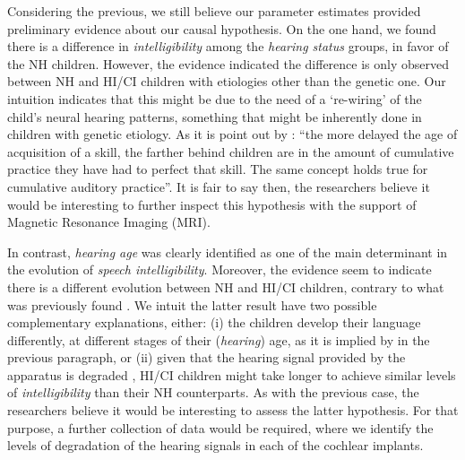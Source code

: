 \begin{comment}
These claims are easier to understand using a though experiment within our research. Consider we have two children with the same mean entropy, but the second child shows more variability across the $10$ utterances than the first. It is clear that the average entropy measure informs about the child's average SI, indicating that both children have similar level. However, the entropy's heterogeneity across the $10$ utterances also informs about the child's SI, as a higher variability imply transcribers agreed less about the second child's intelligibility.
\end{comment}

Considering the previous, we still believe our parameter estimates provided preliminary evidence about our causal hypothesis. On the one hand, we found there is a difference in \textit{intelligibility} among the \textit{hearing status} groups, in favor of the NH children. However, the evidence indicated the difference is only observed between NH and HI/CI children with etiologies other than the genetic one. Our intuition indicates that this might be due to the need of a `re-wiring' of the child's neural hearing patterns, something that might be inherently done in children with genetic etiology. As it is point out by \citet{Flexer_2011}: ``the more delayed the age of acquisition of a skill, the farther behind children are in the amount of cumulative practice they have had to perfect that skill. The same concept holds true for cumulative auditory practice''. It is fair to say then, the researchers believe it would be interesting to further inspect this hypothesis with the support of Magnetic Resonance Imaging (MRI).

In contrast, \textit{hearing age} was clearly identified as one of the main determinant in the evolution of \textit{speech intelligibility}. Moreover, the evidence seem to indicate there is a different evolution between NH and HI/CI children, contrary to what was previously found \cite{Boonen_et_al_2021}. We intuit the latter result have two possible complementary explanations, either: (i) the children develop their language differently, at different stages of their (\textit{hearing}) age, as it is implied by \citet{Flexer_2011} in the previous paragraph, or (ii) given that the hearing signal provided by the apparatus is degraded \cite{Drennan_et_al_2008}, HI/CI children might take longer to achieve similar levels of \textit{intelligibility} than their NH counterparts. As with the previous case, the researchers believe it would be interesting to assess the latter hypothesis. For that purpose,  a further collection of data would be required, where we identify the levels of degradation of the hearing signals in each of the cochlear implants.

